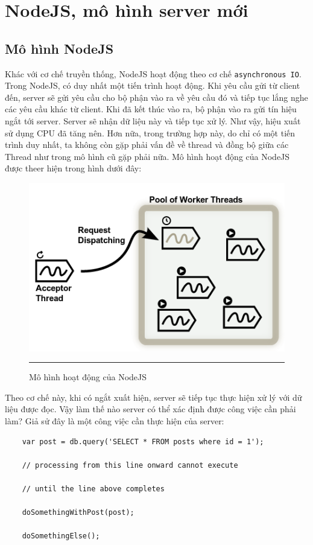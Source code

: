      \section{NodeJS, mô hình server mới}
	\subsection{Mô hình NodeJS}
	Khác với cơ chế truyền thống, NodeJS hoạt động theo cơ chế \texttt{asynchronous IO}. Trong NodeJS, có duy nhất một tiến trình hoạt động. Khi yêu cầu gửi từ client đến, server sẽ gửi yêu cầu cho bộ phận vào ra về yêu cầu đó và tiếp tục lắng nghe các yêu cầu khác từ client. Khi đã kết thúc vào ra, bộ phận vào ra gửi tín hiệu ngắt tới server. Server sẽ nhận dữ liệu này và tiếp tục xử lý. Như vậy, hiệu xuất sử dụng CPU đã tăng nên. Hơn nữa, trong trường hợp này, do chỉ có một tiến trình duy nhất, ta không còn gặp phải vấn đề về thread và đồng bộ giữa các Thread như trong mô hình cũ gặp phải nữa. Mô hình hoạt động của NodeJS được theer hiện trong hình dưới đây:
	\begin{figure}
        \centering
        \includegraphics[scale=0.7]{io}
        \rule{35em}{0.5pt}
        \caption{Mô hình hoạt động của NodeJS}
        \label{fig:nio}
    \end{figure}
	Theo cơ chế này, khi có ngắt xuất hiện, server sẽ tiếp tục thực hiện xử lý với dữ liệu được đọc. Vậy làm thế nào server có thể xác định được công việc cần phải làm? Giả sử đây là một công việc cần thực hiện của server:
\begin{verbatim}
	var post = db.query('SELECT * FROM posts where id = 1');

	// processing from this line onward cannot execute

	// until the line above completes

	doSomethingWithPost(post);

	doSomethingElse();
\end{verbatim}
